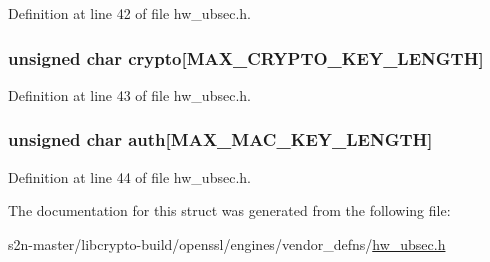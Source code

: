 Definition at line 42 of file hw\+\_\+ubsec.\+h.

\subsubsection[{\texorpdfstring{crypto}{crypto}}]{\setlength{\rightskip}{0pt plus 5cm}unsigned char crypto\mbox{[}{\bf M\+A\+X\+\_\+\+C\+R\+Y\+P\+T\+O\+\_\+\+K\+E\+Y\+\_\+\+L\+E\+N\+G\+TH}\mbox{]}}\hypertarget{structubsec__crypto__context__s_a7514477f6197b993ddb6491aec0827cc}{}\label{structubsec__crypto__context__s_a7514477f6197b993ddb6491aec0827cc}


Definition at line 43 of file hw\+\_\+ubsec.\+h.

\subsubsection[{\texorpdfstring{auth}{auth}}]{\setlength{\rightskip}{0pt plus 5cm}unsigned char auth\mbox{[}{\bf M\+A\+X\+\_\+\+M\+A\+C\+\_\+\+K\+E\+Y\+\_\+\+L\+E\+N\+G\+TH}\mbox{]}}\hypertarget{structubsec__crypto__context__s_ad2321ae6195e63508d9bbc38ec20c7c6}{}\label{structubsec__crypto__context__s_ad2321ae6195e63508d9bbc38ec20c7c6}


Definition at line 44 of file hw\+\_\+ubsec.\+h.



The documentation for this struct was generated from the following file\+:\begin{DoxyCompactItemize}
\item 
s2n-\/master/libcrypto-\/build/openssl/engines/vendor\+\_\+defns/\hyperlink{hw__ubsec_8h}{hw\+\_\+ubsec.\+h}\end{DoxyCompactItemize}
